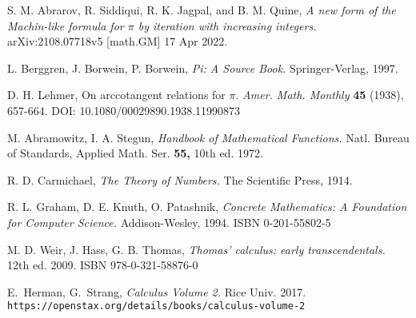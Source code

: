 \documentclass[draft, 10pt]{article} %
\begin{document}
\begin{thebibliography}{999}

S. M. Abrarov, R. Siddiqui, R. K. Jagpal, and B. M. Quine,
{\it A new form of the Machin-like formula for $\pi$ by iteration with increasing integers.\/}
arXiv:2108.07718v5 [math.GM] 17 Apr 2022.

L. Berggren, J. Borwein, P. Borwein,
{\it Pi: A Source Book.\/}
Springer-Verlag, 1997.

D. H. Lehmer,
On arccotangent relations for $\pi$.
{\it Amer. Math. Monthly} {\bf 45}
(1938), 657-664. DOI: 10.1080/00029890.1938.11990873

M. Abramowitz, I. A. Stegun,
{\it Handbook of Mathematical Functions.\/}
Natl. Bureau of Standards, Applied Math. Ser. {\bf 55,} 10th ed. 1972.

R. D. Carmichael,
{\it The Theory of Numbers.\/}
The Scientific Press, 1914.

R. L. Graham, D. E. Knuth, O. Patashnik,
{\it Concrete Mathematics: A Foundation for Computer Science.\/}
Addison-Wesley, 1994.\hfill\break
ISBN 0-201-55802-5

M. D. Weir, J. Hass, G. B. Thomas,
{\it Thomas’ calculus: early transcendentals.\/} 12th ed. 2009.
ISBN 978-0-321-58876-0

E.~Herman, %
G.~Strang, %
{\it Calculus Volume 2.\/} Rice Univ. 2017.\hfill\break
{\tt https://openstax.org/details/books/calculus-volume-2}


\end{thebibliography}
\end{document}

